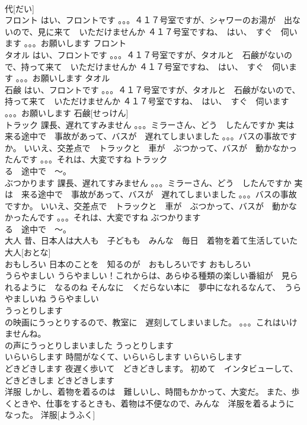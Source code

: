 \documentclass[8pt]{extreport}
\begin{document}
\begin{CJK}{UTF8}{min}
\\	代[だい]			
\\	フロント	はい、フロントです 。。。４１７号室ですが、シャワーのお湯が　出ないので、見に来て　いただけませんか ４１７号室ですね、　はい、　すぐ　伺います 。。。お願いします	フロント						
\\	タオル	はい、フロントです 。。。４１７号室ですが、タオルと　石鹸がないので、持って来て　いただけませんか ４１７号室ですね、　はい、　すぐ　伺います 。。。お願いします	タオル						
\\	石鹸	はい、フロントです 。。。４１７号室ですが、タオルと　石鹸がないので、持って来て　いただけませんか ４１７号室ですね、　はい、　すぐ　伺います 。。。お願いします	石鹸[せっけん]			
\\	トラック	課長、遅れてすみません 。。。ミラーさん、どう　したんですか 実は　来る途中で　事故があって、バスが　遅れてしまいました 。。。バスの事故ですか。 いいえ、交差点で　トラックと　車が　ぶつかって、バスが　動かなかったんです 。。。それは、大変ですね	トラック				
\\	る　途中で　～。
\\	ぶつかります	課長、遅れてすみません 。。。ミラーさん、どう　したんですか 実は　来る途中で　事故があって、バスが　遅れてしまいました 。。。バスの事故ですか。 いいえ、交差点で　トラックと　車が　ぶつかって、バスが　動かなかったんです 。。。それは、大変ですね	ぶつかります			
\\	る　途中で　～。
\\	大人	昔、日本人は大人も　子どもも　みんな　毎日　着物を着て生活していた	大人[おとな]			
\\	おもしろい	日本のことを　知るのが　おもしろいです	おもしろい			
\\	うらやましい	うらやましい！これからは、あらゆる種類の楽しい番組が　見られるように　なるのね そんなに　くだらない本に　夢中になれるなんて、　うらやましいね	うらやましい			
\\	うっとりします	
\\	の映画にうっとりするので、教室に　遅刻してしまいました。 。。。これはいけませんね。 
\\	の声にうっとりしまいました	うっとりします			
\\	いらいらします	時間がなくて、いらいらします	いらいらします			
\\	どきどきします	夜遅く歩いて　どきどきします。 初めて　インタビューして、　どきどきしま	どきどきします			
\\	洋服	しかし、着物を着るのは　難しいし、時間もかかって、大変だ。 また、歩くときや、仕事をするときも、着物は不便なので、みんな　洋服を着るように　なった。	洋服[ようふく]			

\end{CJK}
\end{document}
